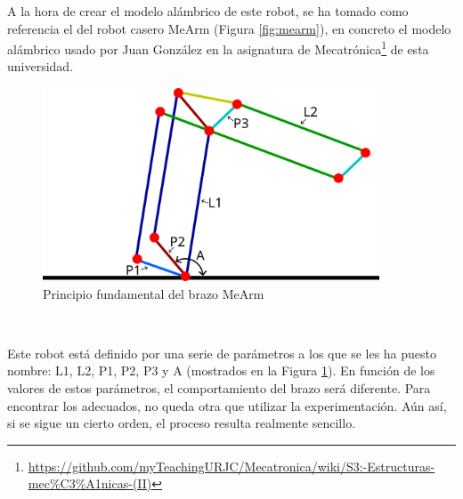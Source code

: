 A la hora de crear el modelo alámbrico de este robot, se ha tomado como referencia el del robot 
casero MeArm (Figura \ref{fig:mearm}), en concreto el modelo alámbrico usado por Juan González en la asignatura de 
Mecatrónica\footnote{\url{https://github.com/myTeachingURJC/Mecatronica/wiki/S3:-Estructuras-mec\%C3\%A1nicas-(II)}} de esta universidad.\\
\begin{figure} [ht!]
  \begin{center}
    \includegraphics[width=10cm]{figs/mearm_params.png}
  \end{center}
  \caption{Principio fundamental del brazo MeArm}
  \label{fig:mearm_params}
\end{figure}\ 


Este robot está definido por una serie de parámetros a los que se les ha puesto nombre: L1, L2, P1, P2, P3 y A (mostrados 
en la Figura \ref{fig:mearm_params}). En función de los valores de estos parámetros, el comportamiento del brazo será diferente. Para 
encontrar los adecuados, no queda otra que utilizar la experimentación. Aún así, si se sigue un cierto orden, el proceso resulta realmente sencillo. 


